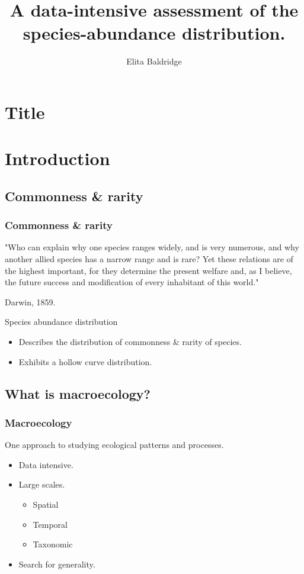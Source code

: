 \documentclass[14pt]{beamer}
\author{Elita Baldridge}
\title[17pt]{A data-intensive assessment of the species-abundance distribution.}
\date{}
\institute{\texttt{[image: ../Miscellaneous/Pictures/ecology\_center\_horizontal.jpg]}\texttt{[image: ../Miscellaneous/Pictures/Weecology.png]}}
\begin{document}
\section{Title}
\begin{frame}[t]
\titlepage
\end{frame}


\section{Introduction}
\subsection{Commonness & rarity}
\begin{frame}[t]
\frametitle{Commonness \& rarity}
"Who can explain why one species ranges widely, and is very numerous, and why another allied species has a narrow range and is rare?  Yet these relations are of the highest important, for they determine the present welfare and, as I believe, the future success and modification of every inhabitant of this world."  


Darwin, 1859.

\end{frame}

\begin{frame}
Species abundance distribution
\begin{itemize}
\item Describes the distribution of commonness \& rarity of species.
\item Exhibits a hollow curve distribution.
\end{itemize}
\end{frame}

\subsection{What is macroecology?}
\begin{frame}[t]
\frametitle{Macroecology}
\normalsize One approach to studying ecological patterns and processes.\\
\begin{itemize}
\item Data intensive.
\item Large scales.
\begin{itemize}
\item Spatial
\item Temporal
\item Taxonomic
\end{itemize}
\item Search for generality.
\end{itemize}
\end{frame}
\end{document}
